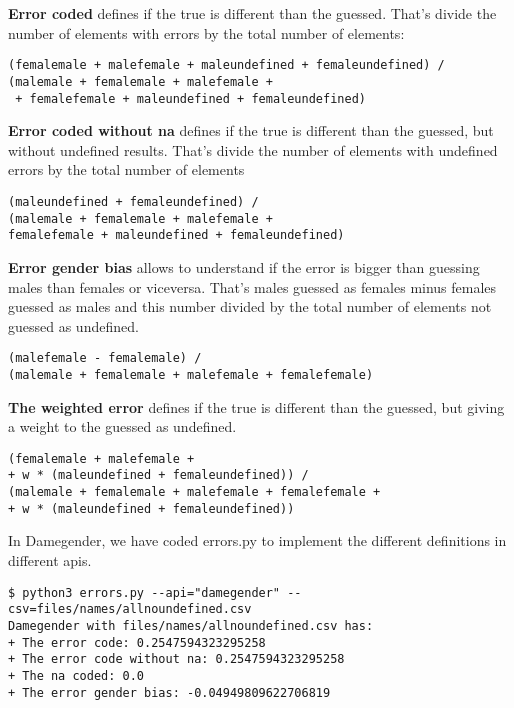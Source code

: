 \documentclass[fleqn,10pt,lineno]{wlpeerj} %
\begin{document}
\textbf{Error coded} defines if the true is different than the
guessed. That's divide the number of elements with errors by the
total number of elements:

\begin{verbatim}
(femalemale + malefemale + maleundefined + femaleundefined) /
(malemale + femalemale + malefemale +
 + femalefemale + maleundefined + femaleundefined)
\end{verbatim}

\textbf{Error coded without na} defines if the true is different than
the guessed, but without undefined results. That's divide the number
of elements with undefined errors by the total number of elements

\begin{verbatim}
(maleundefined + femaleundefined) /
(malemale + femalemale + malefemale +
femalefemale + maleundefined + femaleundefined)
\end{verbatim}

\textbf{Error gender bias} allows to understand if the error is bigger
than guessing males than females or viceversa. That's males guessed as
females minus females guessed as males and this number divided by
the total number of elements not guessed as undefined.

\begin{verbatim}
(malefemale - femalemale) /
(malemale + femalemale + malefemale + femalefemale)
\end{verbatim}

\textbf{The weighted error} defines if the true is different than the
guessed, but giving a weight to the guessed as undefined.

\begin{verbatim}
(femalemale + malefemale +
+ w * (maleundefined + femaleundefined)) /
(malemale + femalemale + malefemale + femalefemale +
+ w * (maleundefined + femaleundefined))
\end{verbatim}

In Damegender, we have coded errors.py to implement the different definitions in different apis.

\begin{verbatim}
$ python3 errors.py --api="damegender" --csv=files/names/allnoundefined.csv
Damegender with files/names/allnoundefined.csv has:
+ The error code: 0.2547594323295258
+ The error code without na: 0.2547594323295258
+ The na coded: 0.0
+ The error gender bias: -0.04949809622706819
\end{verbatim}
\end{document}
